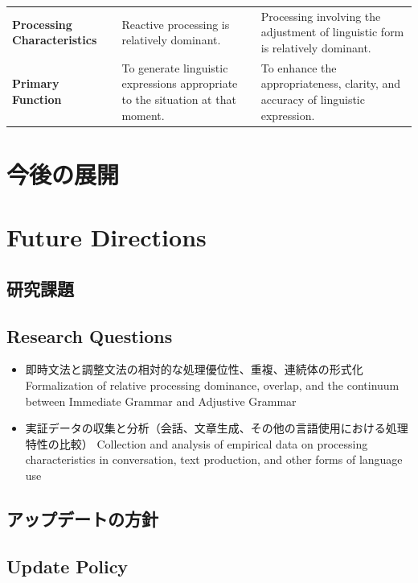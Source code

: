 \documentclass[a4paper]{article}
\begin{document}
\begin{table}[ht]
\begin{tabular}{@{}
>{\raggedright\arraybackslash}p{30mm}
>{\raggedright\arraybackslash}p{60mm}
>{\raggedright\arraybackslash}p{60mm}
@{}
}
\textbf{Processing Characteristics}
& Reactive processing is relatively dominant.
& Processing involving the adjustment of linguistic form is relatively dominant. \\

\textbf{Primary Function}
& To generate linguistic expressions appropriate to the situation at that moment.
& To enhance the appropriateness, clarity, and accuracy of linguistic expression. \\

\end{tabular}
\end{table}
\fi

\ifJPN
  \section{今後の展開}
\else
  \section{Future Directions}
\fi

\ifJPN
  \subsection{研究課題}
\else
  \subsection{Research Questions}
\fi

\begin{itemize}
  \item
\ifJPN
即時文法と調整文法の相対的な処理優位性、重複、連続体の形式化
\else
Formalization of relative processing dominance, overlap, and the continuum between Immediate Grammar and Adjustive Grammar
\fi

  \item
\ifJPN
実証データの収集と分析（会話、文章生成、その他の言語使用における処理特性の比較）
\else
Collection and analysis of empirical data on processing characteristics in conversation, text production, and other forms of language use
\fi
\end{itemize}

\ifJPN
  \subsection{アップデートの方針}
\else
  \subsection{Update Policy}
\fi
\end{document}
